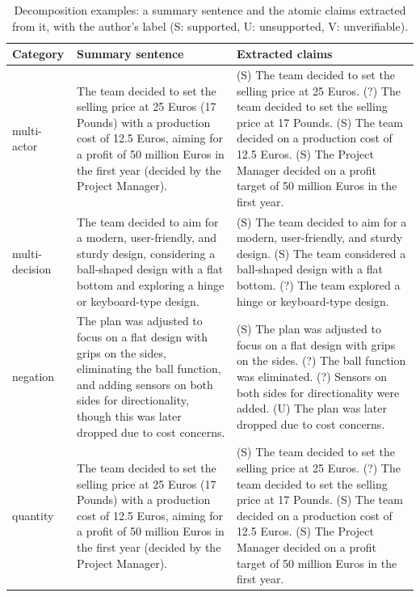 \begin{table}[htbp]
\centering
\caption{Decomposition examples: a summary sentence and the atomic claims extracted from it, with the author's label (S: supported, U: unsupported, V: unverifiable).}
\label{tab:decompex}
\small
\begin{tabularx}{\textwidth}{@{}lXX@{}}
\toprule
Category & Summary sentence & Extracted claims \\
\midrule
multi-actor & The team decided to set the selling price at 25 Euros (17 Pounds) with a production cost of 12.5 Euros, aiming for a profit of 50 million Euros in the first year (decided by the Project Manager). & (S) The team decided to set the selling price at 25 Euros. \newline (?) The team decided to set the selling price at 17 Pounds. \newline (S) The team decided on a production cost of 12.5 Euros. \newline (S) The Project Manager decided on a profit target of 50 million Euros in the first year. \\
multi-decision & The team decided to aim for a modern, user-friendly, and sturdy design, considering a ball-shaped design with a flat bottom and exploring a hinge or keyboard-type design. & (S) The team decided to aim for a modern, user-friendly, and sturdy design. \newline (S) The team considered a ball-shaped design with a flat bottom. \newline (?) The team explored a hinge or keyboard-type design. \\
negation & The plan was adjusted to focus on a flat design with grips on the sides, eliminating the ball function, and adding sensors on both sides for directionality, though this was later dropped due to cost concerns. & (S) The plan was adjusted to focus on a flat design with grips on the sides. \newline (?) The ball function was eliminated. \newline (?) Sensors on both sides for directionality were added. \newline (U) The plan was later dropped due to cost concerns. \\
quantity & The team decided to set the selling price at 25 Euros (17 Pounds) with a production cost of 12.5 Euros, aiming for a profit of 50 million Euros in the first year (decided by the Project Manager). & (S) The team decided to set the selling price at 25 Euros. \newline (?) The team decided to set the selling price at 17 Pounds. \newline (S) The team decided on a production cost of 12.5 Euros. \newline (S) The Project Manager decided on a profit target of 50 million Euros in the first year. \\

\end{tabularx}
\end{table}
